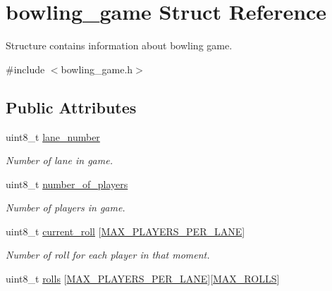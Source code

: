 \hypertarget{structbowling__game}{\section{bowling\-\_\-game Struct Reference}
\label{structbowling__game}
}


Structure contains information about bowling game.  




{\ttfamily \#include $<$bowling\-\_\-game.\-h$>$}

\subsection*{Public Attributes}
\begin{DoxyCompactItemize}
\item 
\hypertarget{structbowling__game_aa10f4576253594e90690c1d181996114}{uint8\-\_\-t \hyperlink{structbowling__game_aa10f4576253594e90690c1d181996114}{lane\-\_\-number}}\label{structbowling__game_aa10f4576253594e90690c1d181996114}

\begin{DoxyCompactList}\small\item\em Number of lane in game. \end{DoxyCompactList}\item 
\hypertarget{structbowling__game_ab48317578ab8a124dcd7e72413ba1b42}{uint8\-\_\-t \hyperlink{structbowling__game_ab48317578ab8a124dcd7e72413ba1b42}{number\-\_\-of\-\_\-players}}\label{structbowling__game_ab48317578ab8a124dcd7e72413ba1b42}

\begin{DoxyCompactList}\small\item\em Number of players in game. \end{DoxyCompactList}\item 
\hypertarget{structbowling__game_a438e717c1044b9684ccaff6c84629589}{uint8\-\_\-t \hyperlink{structbowling__game_a438e717c1044b9684ccaff6c84629589}{current\-\_\-roll} \mbox{[}\hyperlink{bowling__game_8h_a06fc87d81c62e9abb8790b6e5713c55bad9d4e23298ae8d4d51209ba1f4b041ad}{M\-A\-X\-\_\-\-P\-L\-A\-Y\-E\-R\-S\-\_\-\-P\-E\-R\-\_\-\-L\-A\-N\-E}\mbox{]}}\label{structbowling__game_a438e717c1044b9684ccaff6c84629589}

\begin{DoxyCompactList}\small\item\em Number of roll for each player in that moment. \end{DoxyCompactList}\item 
\hypertarget{structbowling__game_a1dd2895640e5b8c4912e7be4da88bfa7}{uint8\-\_\-t \hyperlink{structbowling__game_a1dd2895640e5b8c4912e7be4da88bfa7}{rolls} \mbox{[}\hyperlink{bowling__game_8h_a06fc87d81c62e9abb8790b6e5713c55bad9d4e23298ae8d4d51209ba1f4b041ad}{M\-A\-X\-\_\-\-P\-L\-A\-Y\-E\-R\-S\-\_\-\-P\-E\-R\-\_\-\-L\-A\-N\-E}\mbox{]}\mbox{[}\hyperlink{bowling__game_8h_a06fc87d81c62e9abb8790b6e5713c55ba19af435acf39debc9cd34d101e3d80c9}{M\-A\-X\-\_\-\-R\-O\-L\-L\-S}\mbox{]}}\label{structbowling__game_a1dd2895640e5b8c4912e7be4da88bfa7}


\end{DoxyCompactItemize}
